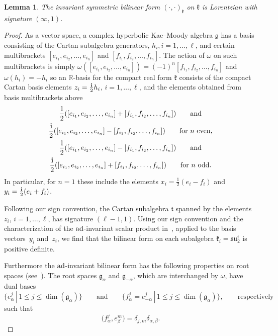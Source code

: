 \documentclass[pdftex]{sigma}
\numberwithin{equation}{section}
\newtheorem{Lemma}[Theorem]{Lemma}
\def\R{\mathbb{R}}
\def\bi{{\bf i}}
\def\g{\mathfrak{g}}
\def\k{\mathfrak{k}}
\def\ft{\mathfrak{t}}
\def\fsu{\mathfrak{su}}
\begin{document}
\begin{Lemma}
The invariant symmetric bilinear form $(\cdot,\cdot)_{\k}$ on $\k$ is Lorentzian with signature $(\infty,1)$.
\end{Lemma}

\begin{proof} As a vector space, a complex hyperbolic Kac--Moody algebra $\g$ has a basis consisting of the Cartan subalgebra
generators, $h_i, i=1,\dots, \ell$, and certain multibrackets $[e_{i_1},e_{i_2},\dots,e_{i_n}]$ and $[f_{i_1},f_{i_2},\dots,f_{i_n}]$.
The action of $\omega$ on such multibrackets is simply $\omega([e_{i_1},e_{i_2},\dots,e_{i_n}]) = (-1)^n [f_{i_1},f_{i_2},\dots,f_{i_n}]$
and $\omega(h_i) = -h_i$ so an $\R$-basis for the compact real form $\k$ consists of the compact Cartan basis elements
$z_i =\frac{\bi}{2}h_i$, $i=1,\dots, \ell$, and the elements obtained from basis multibrackets above
\begin{gather*}
\frac{1}{2} ([e_{i_1},e_{i_2},\dots,e_{i_n}] + [f_{i_1},f_{i_2},\dots,f_{i_n}] ) \qquad \text{and}\\
 \frac{\bi}{2} ([e_{i_1},e_{i_2},\dots,e_{i_n}] - [f_{i_1},f_{i_2},\dots,f_{i_n}] )\qquad \text{for $n$ even},\\
\frac{1}{2} ([e_{i_1},e_{i_2},\dots,e_{i_n}] - [f_{i_1},f_{i_2},\dots,f_{i_n}] ) \qquad \text{and}\\
 \frac{\bi}{2} ([e_{i_1},e_{i_2},\dots,e_{i_n}] + [f_{i_1},f_{i_2},\dots,f_{i_n}] )\qquad \text{for $n$ odd}.
\end{gather*}
In particular, for $n = 1$ these include the elements $x_i=\frac{1}{2}(e_i-f_i)$ and
$y_i=\frac{\bi}{2}(e_i+f_i)$.

Following our sign convention, the Cartan subalgebra $\ft$ spanned by the elements $z_i$, $i=1,\dots, \ell$, has signature $(\ell-1,1)$. Using our sign convention and the characterization of the ${\rm ad}$-invariant scalar product in~\cite[equation~(2.2.1)]{Kac90}, applied to the basis vectors~$y_i$ and~$z_i$, we find that the bilinear form on each subalgebra $\k_i=\fsu_2^i$ is positive definite.

Furthermore the ${\rm ad}$-invariant bilinear form has the following properties on root spaces (see~\cite[Sections~2.1 and~2.2]{Kac90}). The root spaces $\g_{\alpha}$ and $\g_{-\alpha}$, which are interchanged by $\omega$, have dual bases
 \[\big\{e_{\alpha}^{j}\, |\, 1\leq j\leq \dim (\g_{\alpha})\big\} \qquad \text{and} \qquad
 \big\{f_{\alpha}^{j} = e_{-\alpha}^{j}\, |\, 1\leq j\leq \dim (\g_{\alpha}) \big\}, \qquad \text{respectively}\]
 such that
\[\big( f_{\alpha}^j, e_{\beta}^m\big) =\delta_{j,m}\delta_{\alpha, \beta} .\]


\end{proof}
\end{document}
